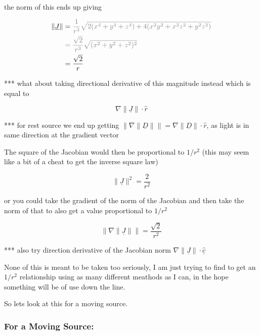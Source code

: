 the norm of this ends up giving

\begin{equation}
	\begin{aligned}
		\|\underline{J}\| & = \color{gray} \frac{1}{r^3} \sqrt{2(x^4 + y^4 + z^4) + 4 (x^2y^2 + x^2z^2 + y^2z^2)} \\
		                  & \color{gray} = \frac{\sqrt{2}}{r^3} \sqrt{(x^2 + y^2 + z^2)^2}                        \\
		                  & = \frac{\sqrt{2}}{ r }
	\end{aligned}
\end{equation}

*** what about taking directional derivative of this magnitude instead which is equal to

\begin{equation}
	\nabla \| \underline{J} \| \cdot \hat{r}
\end{equation}

*** for rest source we end up getting $\Big\| \nabla \| \underline{D} \| \Big\| = \nabla \| \underline{D} \| \cdot \hat{r}$, as light is in same direction at the gradient vector

The square of the Jacobian would then be proportional to $1/r^2$ (this may seem like a bit of a cheat to get the inverse square law)

\begin{equation}
	\|\underline{J}\|^2 = \frac{2}{r^2}
\end{equation}

or you could take the gradient of the norm of the Jacobian and then take the norm of that to also get a value proportional to $1/r^2$

\begin{equation}
	\big\| \nabla \|\underline{J}\| \big\| = \frac{\sqrt{2}}{r^2}
\end{equation}

*** also try direction derivative of the Jacobian norm $ \nabla \|\underline{J}\| \cdot \hat{\underline{c}}$

None of this is meant to be taken too seriously, I am just trying to find to get an $1/r^2$ relationship using as many different meathods as I can, in the hope something will be of use down the line.

So lets look at this for a moving source.

\subsubsection{For a Moving Source:}\label{subsubsect: General Equations for Moving Source 4}

